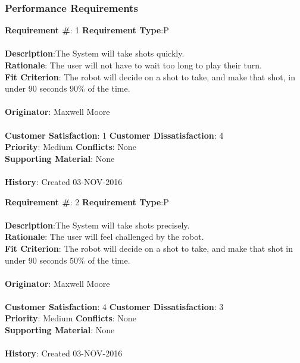 \documentclass[titlepage]{article}
\begin{document}
\subsubsection{Performance Requirements}
\begin{framed}
	\noindent\textbf{Requirement \#}: 1 \hfill \textbf{Requirement Type}:P\hfill\\\\
	\noindent\textbf{Description}:The System will take shots quickly.\\
	\textbf{Rationale}: The user will not have to wait too long to play their turn.\\
	\textbf{Fit Criterion}: The robot will decide on a shot to take, and make that shot, in under 90 seconds 90\% of the time.\\\\
	\textbf{Originator}: Maxwell Moore\\\\
	\noindent\textbf{Customer Satisfaction}: 1 \hfill 	\textbf{Customer Dissatisfaction}: 4 \hfill\\
	\textbf{Priority}: Medium \hfill \textbf{Conflicts}: None \hfill\\
	\textbf{Supporting Material}: None\\\\
	\noindent\textbf{History}: Created 03-NOV-2016
\end{framed}

\begin{framed}
	\noindent\textbf{Requirement \#}: 2 \hfill \textbf{Requirement Type}:P\hfill\\\\
	\noindent\textbf{Description}:The System will take shots precisely.\\
	\textbf{Rationale}: The user will feel challenged by the robot.\\
	\textbf{Fit Criterion}: The robot will decide on a shot to take, and make that shot in under 90 seconds 50\% of the time.\\\\
	\textbf{Originator}: Maxwell Moore\\\\
	\noindent\textbf{Customer Satisfaction}: 4 \hfill 	\textbf{Customer Dissatisfaction}: 3\hfill\\
	\textbf{Priority}: Medium \hfill \textbf{Conflicts}: None \hfill\\
	\textbf{Supporting Material}: None\\\\
	\noindent\textbf{History}: Created 03-NOV-2016
\end{framed}
\end{document}
